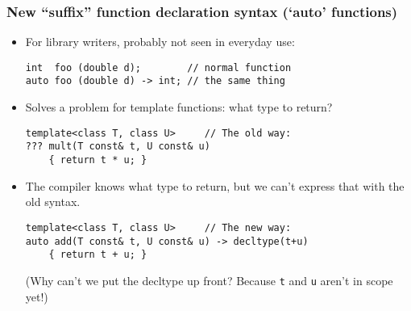
\begin{frame}[fragile]
\frametitle{New ``suffix'' function declaration syntax (`auto' functions)}
\begin{itemize}
\item For library writers, probably not seen in everyday use:
{\scriptsize
\begin{verbatim}
int  foo (double d);        // normal function
auto foo (double d) -> int; // the same thing
\end{verbatim}}
\vskip 6pt
\item Solves a problem for template functions: what type to return?
{\scriptsize
\begin{verbatim}
template<class T, class U>     // The old way:
??? mult(T const& t, U const& u)
    { return t * u; }
\end{verbatim}}
\vskip 6pt

\item The compiler knows what type to return, but we can't express
  that with the old syntax.
{\scriptsize
\begin{verbatim}
template<class T, class U>     // The new way:
auto add(T const& t, U const& u) -> decltype(t+u)
    { return t + u; }
\end{verbatim}}
\vskip 6pt
(Why can't we put the decltype up front?  Because \texttt{t} and
\texttt{u} aren't in scope yet!)
\end{itemize}
\end{frame}

